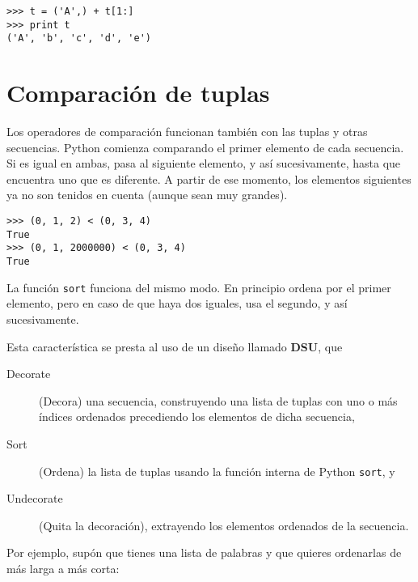 \beforeverb
\begin{verbatim}
>>> t = ('A',) + t[1:]
>>> print t
('A', 'b', 'c', 'd', 'e')
\end{verbatim}
\afterverb
%

\section{Comparación de tuplas}


Los operadores de comparación funcionan también con las tuplas y otras secuencias.
Python comienza comparando el primer elemento de cada
secuencia. Si es igual en ambas, pasa al siguiente elemento,
y así sucesivamente, hasta que encuentra uno que es diferente. A partir de ese momento,
los elementos siguientes ya no son tenidos en cuenta (aunque sean muy grandes).


\beforeverb
\begin{verbatim}
>>> (0, 1, 2) < (0, 3, 4)
True
>>> (0, 1, 2000000) < (0, 3, 4)
True
\end{verbatim}
\afterverb
%
La función {\tt sort} funciona del mismo modo. En principio
ordena por el primer elemento, pero en caso de que haya dos iguales,
usa el segundo, y así sucesivamente. 

Esta característica se presta al uso de un diseño llamado {\bf DSU}, que

\begin{description}

\item[Decorate] (Decora) una secuencia, construyendo una lista de tuplas
con uno o más índices ordenados precediendo los elementos de dicha secuencia,

\item[Sort] (Ordena) la lista de tuplas usando la función interna de Python {\tt sort}, y

\item[Undecorate] (Quita la decoración), extrayendo los elementos ordenados de la secuencia.

\end{description}

\label{DSU}

Por ejemplo, supón que tienes una lista de palabras y que quieres
ordenarlas de más larga a más corta:

